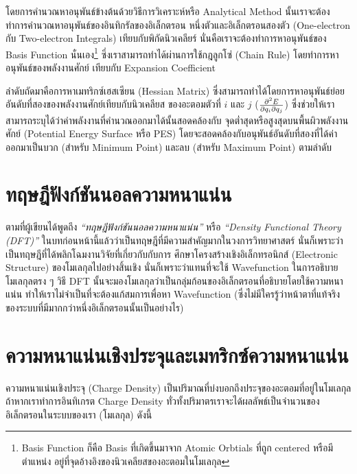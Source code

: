 โดยการคำนวณหาอนุพันธ์ข้างต้นด้วยวิธีการวิเคราะห์หรือ Analytical Method นั้นเราจะต้องทำการคำนวณหาอนุพันธ์ของอินทิกรัลของอิเล็กตรอน%
หนึ่งตัวและอิเล็กตรอนสองตัว (One-electron กับ Two-electron Integrals) เทียบกับพิกัดนิวเคลียร์ นั่นคือเราจะต้องทำการหาอนุพันธ์ของ 
Basis Function นั่นเอง\footnote{Basis Function ก็คือ Basis ที่เกิดขึ้นมาจาก Atomic Orbtials ที่ถูก centered หรือมีตำแหน่ง%
อยู่ที่จุดอ้างอิงของนิวเคลียสของอะตอมในโมเลกุล} ซึ่งเราสามารถทำได้ผ่านการใช้กฎลูกโซ่ (Chain Rule) โดยทำการหาอนุพันธ์ของพลังงานศักย์%
เทียบกับ Expansion Coefficient

ลำดับถัดมาคือการหาเมทริกซ์เฮสเซียน (Hessian Matrix) ซึ่งสามารถทำได้โดยการหาอนุพันธ์ย่อยอันดับที่สองของพลังงานศักย์เทียบกับนิวเคลียส%
ของอะตอมตัวที่ $i$ และ $j$ ($\pdv{E}{q_{i}}{q_{j}}$) ซึ่งช่วยให้เราสามารถระบุได้ว่าค่าพลังงานที่คำนวณออกมาได้นั้นสอดคล้องกับ%
จุดต่ำสุดหรือสูงสุดบนพื้นผิวพลังงานศักย์ (Potential Energy Surface หรือ PES) โดยจะสอดคล้องกับอนุพันธ์อันดับที่สองที่ได้ค่าออกมาเป็นบวก 
(สำหรับ Minimum Point) และลบ (สำหรับ Maximum Point) ตามลำดับ

\section{ทฤษฎีฟังก์ชันนอลความหนาแน่น}
\label{sec:dft}

ตามที่ผู้เขียนได้พูดถึง \textit{\enquote{ทฤษฎีฟังก์ชันนอลความหนาแน่น}} หรือ \textit{\enquote{Density Functional Theory 
(DFT)}} ในบทก่อนหน้านี้แล้วว่าเป็นทฤษฎีที่มีความสำคัญมากในวงการวิทยาศาสตร์ นั่นก็เพราะว่าเป็นทฤษฎีที่ได้พลิกโฉมงานวิจัยที่เกี่ยวกับกับการ%
ศึกษาโครงสร้างเชิงอิเล็กทรอนิกส์ (Electronic Structure) ของโมเลกุลไปอย่างสิ้นเชิง นั่นก็เพราะว่าแทนที่จะใช้ Wavefunction ในการอธิบาย%
โมเลกุลตรง ๆ วิธี DFT นั้นจะมองโมเลกุลว่าเป็นกลุ่มก้อนของอิเล็กตรอนที่อธิบายโดยใช้ความหนาแน่น ทำให้เราไม่จำเป็นที่จะต้องแก้สมการเพื่อหา 
Wavefunction (ซึ่งไม่มีใครรู้ว่าหน้าตาที่แท้จริงของระบบที่มีมากกว่าหนึ่งอิเล็กตรอนนั้นเป็นอย่างไร)

\section{ความหนาแน่นเชิงประจุและเมทริกซ์ความหนาแน่น}
\label{sec:charge_den}

ความหนาแน่นเชิงประจุ (Charge Density) เป็นปริมาณที่บ่งบอกถึงประจุของอะตอมที่อยู่ในโมเลกุล ถ้าหากเราทำการอินทิเกรต Charge Density 
ทั่วทั้งปริมาตรเราจะได้ผลลัพธ์เป็นจำนวนของอิเล็กตรอนในระบบของเรา (โมเลกุล) ดังนี้\autocite{szabo1996}

